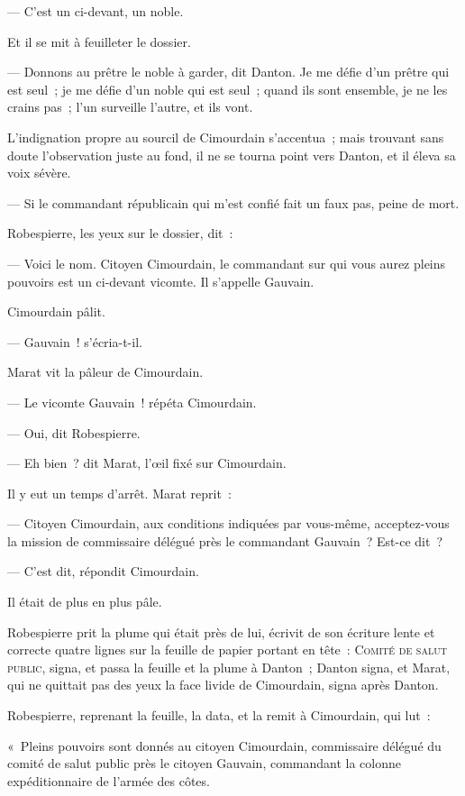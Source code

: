 \documentclass[french,twoside]{book} %
\def\mednobreak{\ifdim\lastskip<\medskipamount
  \removelastskip\nopagebreak\medskip\fi}
\newcommand{\labelblock}[1]{\medbreak{\noindent\color{rubric}\bfseries #1}\par\mednobreak}
\begin{document}
— C’est un ci-devant, un noble.\par
Et il se mit à feuilleter le dossier.\par
— Donnons au prêtre le noble à garder, dit Danton. Je me défie d’un prêtre qui est seul ; je me défie d’un noble qui est seul ; quand ils sont ensemble, je ne les crains pas ; l’un surveille l’autre, et ils vont.\par
L’indignation propre au sourcil de Cimourdain s’accentua ;  mais trouvant sans doute l’observation juste au fond, il ne se tourna point vers Danton, et il éleva sa voix sévère.\par
— Si le commandant républicain qui m’est confié fait un faux pas, peine de mort.\par
Robespierre, les yeux sur le dossier, dit :\par
— Voici le nom. Citoyen Cimourdain, le commandant sur qui vous aurez pleins pouvoirs est un ci-devant vicomte. Il s’appelle Gauvain.\par
Cimourdain pâlit.\par
— Gauvain ! s’écria-t-il.\par
Marat vit la pâleur de Cimourdain.\par
— Le vicomte Gauvain ! répéta Cimourdain.\par
— Oui, dit Robespierre.\par
— Eh bien ? dit Marat, l’œil fixé sur Cimourdain.\par
Il y eut un temps d’arrêt. Marat reprit :\par
— Citoyen Cimourdain, aux conditions indiquées par vous-même, acceptez-vous la mission de commissaire délégué près le commandant Gauvain ? Est-ce dit ?\par
— C’est dit, répondit Cimourdain.\par
Il était de plus en plus pâle.\par
Robespierre prit la plume qui était près de lui, écrivit de son écriture lente et correcte quatre lignes sur la feuille de papier portant en tête : C{\scshape omité de salut public}, signa, et passa la feuille et la plume à Danton ; Danton signa, et Marat, qui ne quittait pas des yeux la face livide de Cimourdain, signa après Danton.\par
Robespierre, reprenant la feuille, la data, et la remit à Cimourdain, qui lut :\par
 
\labelblock{an ii de la république}

\noindent « Pleins pouvoirs sont donnés au citoyen Cimourdain, commissaire délégué du comité de salut public près le citoyen Gauvain, commandant la colonne expéditionnaire de l’armée des côtes.\par
\end{document}
